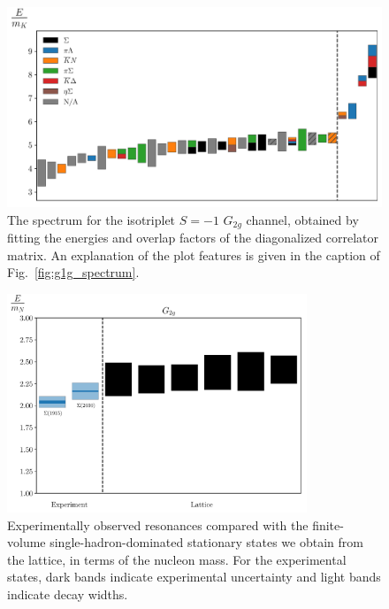 \begin{figure}[H]
    \centering
    \hspace*{-0.5in}\includegraphics[width=\textwidth]{figures/sigmas/g2g/staircase_mk.pdf}
    \caption[The spectrum for the isotriplet $S=-1$ $G_{2g}$ channel, obtained by fitting the energies and overlap factors of the diagonalized correlator matrix.]{The spectrum for the isotriplet $S=-1$ $G_{2g}$ channel, obtained by fitting the energies and overlap factors of the diagonalized correlator matrix. An explanation of the plot features is given in the caption of Fig.~\ref{fig:g1g_spectrum}.}\label{fig:g2g_spectrum}
\end{figure}

\begin{figure}[H]
    \centering
    \hspace*{-1cm}\includegraphics[width=0.8\textwidth]{figures/sigmas/g2g/expvslat.pdf}
    \caption[Experimentally observed resonances compared with the finite-volume single-hadron-dominated stationary states we obtain from the lattice in $G_{2g}$, in terms of the nucleon mass.]{Experimentally observed resonances compared with the finite-volume single-hadron-dominated stationary states we obtain from the lattice, in terms of the nucleon mass. For the experimental states, dark bands indicate experimental uncertainty and light bands indicate decay widths.}\label{fig:g2g_exp}
\end{figure}

